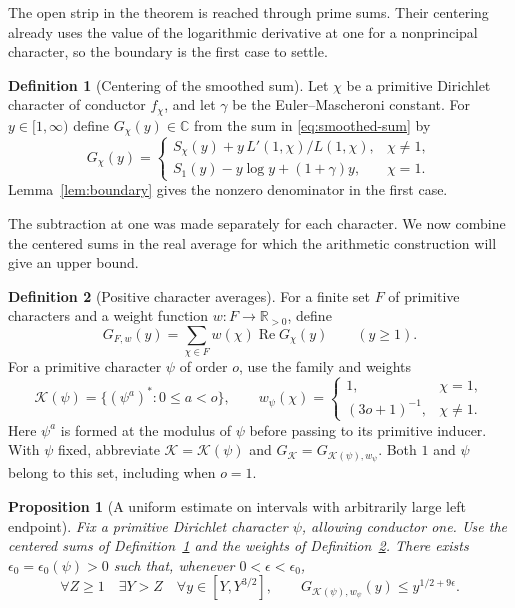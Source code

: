 \documentclass[11pt]{article}
\newtheorem{proposition}[theorem]{Proposition}
\theoremstyle{definition}
\newtheorem{definition}{Definition}[section]
\theoremstyle{plain}
\newcommand{\RePart}{\operatorname{Re}}
\begin{document}
The open strip in the theorem is reached through prime sums. Their centering already
uses the value of the logarithmic derivative at one for a nonprincipal character, so
the boundary is the first case to settle.



\begin{definition}[Centering of the smoothed sum]\label{def:smoothed-centering}
Let \(\chi\) be a primitive Dirichlet character of conductor \(f_\chi\), and let \(\gamma\) be the
Euler--Mascheroni constant. For \(y\in[1,\infty)\) define
\(G_\chi(y)\in\mathbb C\) from the sum in \eqref{eq:smoothed-sum} by
\begin{equation}\label{eq:centered-sum}
 G_\chi(y)=
 \begin{cases}
 S_\chi(y)+y\,L'(1,\chi)/L(1,\chi),&\chi\ne1,\\
 S_1(y)-y\log y+(1+\gamma)y,&\chi=1 .
 \end{cases}
\end{equation}
Lemma~\ref{lem:boundary} gives the nonzero denominator in the first case.
\end{definition}

The subtraction at one was made separately for each character. We now combine the
centered sums in the real average for which the arithmetic construction will give an
upper bound.

\begin{definition}[Positive character averages]\label{def:family-weights}
For a finite set \(F\) of primitive characters and a weight function
\(w:F\to\mathbb R_{>0}\), define
\[
 G_{F,w}(y)=\sum_{\chi\in F}w(\chi)\RePart G_\chi(y)
                  \qquad(y\ge1).
\]
For a primitive character \(\psi\) of order \(o\), use the family and weights
\[
 \mathcal K(\psi)=\{(\psi^a)^*:0\le a<o\},\qquad
 w_\psi(\chi)=
 \begin{cases}1,&\chi=1,\\ (3o+1)^{-1},&\chi\ne1.\end{cases}
\]
Here \(\psi^a\) is formed at the modulus of \(\psi\) before passing
to its primitive inducer. With \(\psi\) fixed, abbreviate
\(\mathcal K=\mathcal K(\psi)\) and \(G_{\mathcal K}=G_{\mathcal K(\psi),w_\psi}\).
Both \(1\) and \(\psi\) belong to this set, including when \(o=1\).
\end{definition}

\begin{proposition}[A uniform estimate on intervals with arbitrarily large left endpoint]\label{prop:arithmetic}
Fix a primitive Dirichlet character \(\psi\), allowing conductor one. Use the centered sums of Definition~\ref{def:smoothed-centering} and the weights of Definition~\ref{def:family-weights}. There exists
\(\epsilon_0=\epsilon_0(\psi)>0\) such that, whenever
\(0<\epsilon<\epsilon_0\),
\begin{equation}\label{eq:arithmetic-window}
 \forall Z\ge1\quad \exists Y>Z\quad \forall y\in[Y,Y^{3/2}],
 \qquad G_{\mathcal K(\psi),w_\psi}(y)\le y^{1/2+9\epsilon}.
\end{equation}
\end{proposition}
\end{document}
